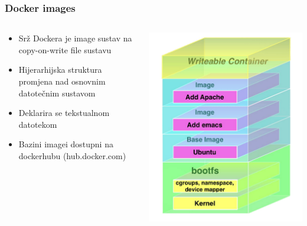 \documentclass[t]{beamer}
\begin{document}
\begin{frame}
	\frametitle{Docker images}
	\begin{columns}[T]
	\begin{column}{0.5\textwidth}
		\begin{itemize}
      \item Srž Dockera je image sustav na copy-on-write file sustavu
      \item Hijerarhijska struktura promjena nad osnovnim datotečnim sustavom
      \item Deklarira se tekstualnom datotekom
      \item Bazini imagei dostupni na dockerhubu (hub.docker.com)
		\end{itemize}

	\end{column}
	\begin{column}{0.5\textwidth}
		\includegraphics[width=\textwidth]{copy-on-write.png}
	\end{column}
	\end{columns}
\end{frame}
\end{document}
